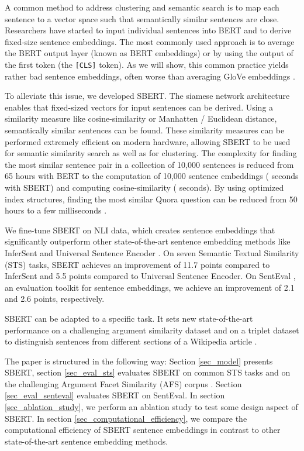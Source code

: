 \documentclass[11pt,a4paper]{article}
\begin{document}
A common method to address clustering and semantic search is to map each sentence to a vector space such that semantically similar sentences are close. Researchers have started to input individual sentences into BERT and to derive fixed-size sentence embeddings. The most commonly used approach is to average the BERT output layer (known as BERT embeddings) or by using the output of the first token (the \texttt{[CLS]} token). As we will show, this common practice yields rather bad sentence embeddings, often worse than averaging GloVe embeddings \cite{glove}.

To alleviate this issue, we developed SBERT. The siamese network architecture enables that fixed-sized vectors for input sentences can be derived. Using a similarity measure like cosine-similarity or Manhatten / Euclidean distance, semantically similar sentences can be found. These similarity measures can be performed extremely efficient on modern hardware, allowing SBERT to be used for semantic similarity search as well as for clustering. The complexity for finding the most similar sentence pair in a collection of 10,000 sentences is reduced from 65 hours with BERT to the computation of 10,000 sentence embeddings ( seconds with SBERT) and computing cosine-similarity ( seconds). By using optimized index structures, finding the most similar Quora question can be reduced from 50 hours to a few milliseconds \cite{JDH17}.


We fine-tune SBERT on NLI data, which creates sentence embeddings that significantly outperform other state-of-the-art sentence embedding methods like InferSent \cite{conneau2017infersent} and Universal Sentence Encoder \cite{universal_sentence_encoder}. On seven Semantic Textual Similarity (STS) tasks, SBERT achieves an improvement of 11.7 points compared to InferSent and 5.5 points compared to Universal Sentence Encoder. On SentEval \cite{conneau2018senteval}, an evaluation toolkit for sentence embeddings, we achieve an improvement of 2.1 and 2.6 points, respectively.

SBERT can be adapted to a specific task. It sets new state-of-the-art performance on a challenging argument similarity dataset \cite{MisraEW16} and on a triplet dataset to distinguish sentences from different sections of a Wikipedia article \cite{ein-dor-etal-2018-learning}.


The paper is structured in the following way: Section \ref{sec_model} presents SBERT, section \ref{sec_eval_sts} evaluates SBERT on common STS tasks and on the challenging Argument Facet Similarity (AFS) corpus \cite{MisraEW16}. Section \ref{sec_eval_senteval} evaluates SBERT on SentEval. In section \ref{sec_ablation_study}, we perform an ablation study to test some design aspect of SBERT. In section \ref{sec_computational_efficiency}, we compare the computational efficiency of SBERT sentence embeddings in contrast to other state-of-the-art sentence embedding methods.
\end{document}
